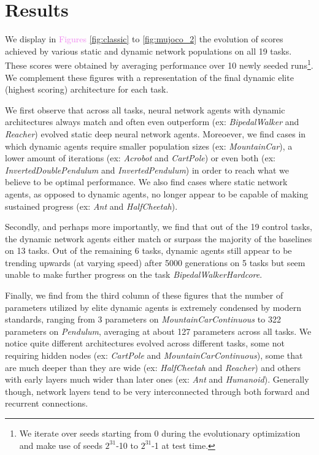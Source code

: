 \documentclass{article} %
\begin{document}
\vspace{-.5em}
\section{Results}
\vspace{-.5em}

We display in \textcolor{violet}{Figures \ref{fig:classic}} to \textcolor{violet}{\ref{fig:mujoco_2}} the evolution of scores achieved by various static and dynamic network populations on all 19 tasks. These scores were obtained by averaging performance over 10 newly seeded runs\footnote{We iterate over seeds starting from 0 during the evolutionary optimization and make use of seeds $2^{31}$-10 to $2^{31}$-1 at test time.}. We complement these figures with a representation of the final dynamic elite (highest scoring) architecture for each task.

We first observe that across all tasks, neural network agents with dynamic architectures always match and often even outperform (ex: \textit{BipedalWalker} and \textit{Reacher}) evolved static deep neural network agents. Moreoever, we find cases in which dynamic agents require smaller population sizes (ex: \textit{MountainCar}), a lower amount of iterations (ex: \textit{Acrobot} and \textit{CartPole}) or even both (ex: \textit{InvertedDoublePendulum} and \textit{InvertedPendulum}) in order to reach what we believe to be optimal performance. We also find cases where static network agents, as opposed to dynamic agents, no longer appear to be capable of making sustained progress (ex: \textit{Ant} and \textit{HalfCheetah}).

Secondly, and perhaps more importantly, we find that out of the 19 control tasks, the dynamic network agents either match or surpass the majority of the baselines on 13 tasks. Out of the remaining 6 tasks, dynamic agents still appear to be trending upwards (at varying speed) after 5000 generations on 5 tasks but seem unable to make further progress on the task \textit{BipedalWalkerHardcore}.

Finally, we find from the third column of these figures that the number of parameters utilized by elite dynamic agents is extremely condensed by modern standards, ranging from 3 parameters on \textit{MountainCarContinuous} to 322 parameters on \textit{Pendulum}, averaging at about 127 parameters across all tasks. We notice quite different architectures evolved across different tasks, some not requiring hidden nodes (ex: \textit{CartPole} and \textit{MountainCarContinuous}), some that are much deeper than they are wide (ex: \textit{HalfCheetah} and \textit{Reacher}) and others with early layers much wider than later ones (ex: \textit{Ant} and \textit{Humanoid}). Generally though, network layers tend to be very interconnected through both forward and recurrent connections.
\end{document}
